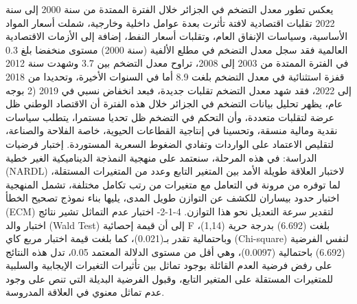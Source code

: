 \documentclass[12pt,a4paper]{report}
\begin{document}
يعكس تطور معدل التضخم في الجزائر خلال الفترة الممتدة من سنة 2000 إلى سنة 2022 تقلبات اقتصادية لافتة تأثرت بعدة عوامل داخلية وخارجية، شملت أسعار المواد الأساسية، وسياسات الإنفاق العام، وتقلبات أسعار النفط، إضافة إلى الأزمات الاقتصادية العالمية فقد سجل معدل التضخم في مطلع الألفية (سنة 2000) مستوى منخفضا بلغ 0.3%
في الفترة الممتدة من 2003 إلى 2008، تراوح معدل التضخم بين 3.7%
وشهدت سنة 2012 قفزة استثنائية في معدل التضخم بلغت 8.9%
أما في السنوات الأخيرة، وتحديدا من 2018 إلى 2022، فقد شهد معدل التضخم تقلبات جديدة، فبعد انخفاض نسبي في 2019 (2%
بوجه عام، يظهر تحليل بيانات التضخم في الجزائر خلال هذه الفترة أن الاقتصاد الوطني ظل عرضة لتقلبات متعددة، وأن التحكم في التضخم ظل تحديا مستمرا، يتطلب سياسات نقدية ومالية منسقة، وتحسينا في إنتاجية القطاعات الحيوية، خاصة الفلاحة والصناعة، لتقليص الاعتماد على الواردات وتفادي الضغوط السعرية المستوردة.
إختبار فرضيات الدراسة:
في هذه المرحلة، سنعتمد على منهجية النمذجة الديناميكية الغير خطية (NARDL) لاختبار العلاقة طويلة الأمد بين المتغير التابع وعدد من المتغيرات المستقلة، لما توفره من مرونة في التعامل مع متغيرات من رتب تكامل مختلفة، تشمل المنهجية اختبار حدود بيساران للكشف عن التوازن طويل المدى، يليها بناء نموذج تصحيح الخطأ (ECM) لتقدير سرعة التعديل نحو هذا التوازن.
4-1-2- اختبار عدم التماثل 
تشير نتائج اختبار والد (Wald Test) إلى أن قيمة إحصائية F بلغت (6.692) بدرجة حرية (1,14)، وباحتمالية تقدر بـ(0.021)، كما بلغت قيمة اختبار مربع كاي (Chi-square) لنفس الفرضية (6.692) باحتمالية (0.0097)، وهي أقل من مستوى الدلالة المعتمد 0.05، تدل هذه النتائج على رفض فرضية العدم القائلة بوجود تماثل بين تأثيرات التغيرات الإيجابية والسلبية للمتغيرات المستقلة على المتغير التابع، وقبول الفرضية البديلة التي تنص على وجود عدم تماثل معنوي في العلاقة المدروسة.
\end{document}
